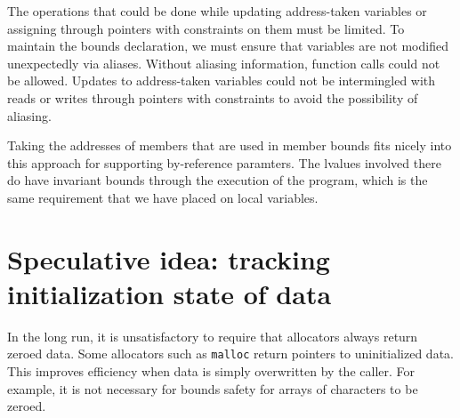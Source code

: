 The operations that could be done while updating
address-taken variables or assigning through pointers with 
constraints on them must be limited.
To maintain the bounds declaration, we must ensure that
variables are not modified unexpectedly via aliases. 
Without aliasing information, function calls could not
be allowed.  Updates to address-taken variables could
not be intermingled with reads or writes through pointers
with constraints to avoid the possibility of aliasing.

Taking the addresses of members that are used in member
bounds fits nicely into this approach for supporting
by-reference paramters.  The lvalues involved there do have
invariant bounds through the execution of the program,
which is the same requirement that we have placed on
local variables.

\section{Speculative idea: tracking initialization state of data}
\label{section:allocation-of-uninitialized-data}

In the long run, it is unsatisfactory to require that allocators always
return zeroed data.  Some allocators such as \texttt{malloc} return pointers to
uninitialized data.  This improves efficiency when data is
simply overwritten by the caller.  For example, it is not necessary
for bounds safety for arrays of characters to be zeroed.

